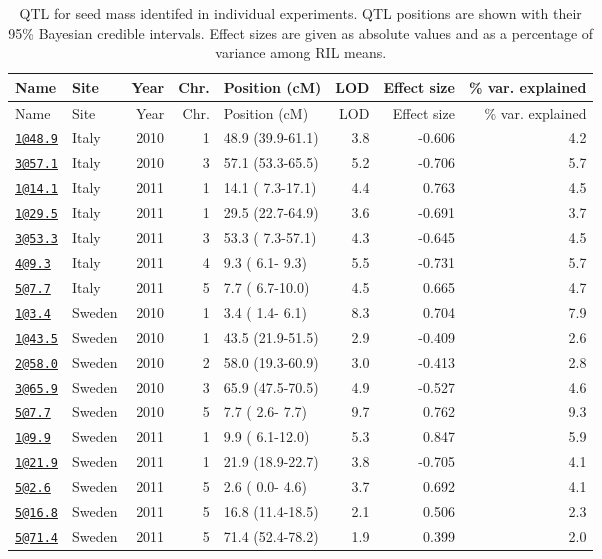 \documentclass[]{article}
\begin{document}
\begin{longtable}[]{@{}llrrlrrr@{}}
\caption{QTL for seed mass identifed in individual experiments. QTL
positions are shown with their 95\% Bayesian credible intervals. Effect
sizes are given as absolute values and as a percentage of variance among
RIL means.}\tabularnewline
\toprule
Name & Site & Year & Chr. & Position (cM) & LOD & Effect size & \% var.
explained\tabularnewline
\midrule
\endfirsthead
\toprule
Name & Site & Year & Chr. & Position (cM) & LOD & Effect size & \% var.
explained\tabularnewline
\midrule
\endhead
\href{mailto:1@48.9}{\nolinkurl{1@48.9}} & Italy & 2010 & 1 & 48.9
(39.9-61.1) & 3.8 & -0.606 & 4.2\tabularnewline
\href{mailto:3@57.1}{\nolinkurl{3@57.1}} & Italy & 2010 & 3 & 57.1
(53.3-65.5) & 5.2 & -0.706 & 5.7\tabularnewline
\href{mailto:1@14.1}{\nolinkurl{1@14.1}} & Italy & 2011 & 1 & 14.1 (
7.3-17.1) & 4.4 & 0.763 & 4.5\tabularnewline
\href{mailto:1@29.5}{\nolinkurl{1@29.5}} & Italy & 2011 & 1 & 29.5
(22.7-64.9) & 3.6 & -0.691 & 3.7\tabularnewline
\href{mailto:3@53.3}{\nolinkurl{3@53.3}} & Italy & 2011 & 3 & 53.3 (
7.3-57.1) & 4.3 & -0.645 & 4.5\tabularnewline
\href{mailto:4@9.3}{\nolinkurl{4@9.3}} & Italy & 2011 & 4 & 9.3 ( 6.1-
9.3) & 5.5 & -0.731 & 5.7\tabularnewline
\href{mailto:5@7.7}{\nolinkurl{5@7.7}} & Italy & 2011 & 5 & 7.7 (
6.7-10.0) & 4.5 & 0.665 & 4.7\tabularnewline
\href{mailto:1@3.4}{\nolinkurl{1@3.4}} & Sweden & 2010 & 1 & 3.4 ( 1.4-
6.1) & 8.3 & 0.704 & 7.9\tabularnewline
\href{mailto:1@43.5}{\nolinkurl{1@43.5}} & Sweden & 2010 & 1 & 43.5
(21.9-51.5) & 2.9 & -0.409 & 2.6\tabularnewline
\href{mailto:2@58.0}{\nolinkurl{2@58.0}} & Sweden & 2010 & 2 & 58.0
(19.3-60.9) & 3.0 & -0.413 & 2.8\tabularnewline
\href{mailto:3@65.9}{\nolinkurl{3@65.9}} & Sweden & 2010 & 3 & 65.9
(47.5-70.5) & 4.9 & -0.527 & 4.6\tabularnewline
\href{mailto:5@7.7}{\nolinkurl{5@7.7}} & Sweden & 2010 & 5 & 7.7 ( 2.6-
7.7) & 9.7 & 0.762 & 9.3\tabularnewline
\href{mailto:1@9.9}{\nolinkurl{1@9.9}} & Sweden & 2011 & 1 & 9.9 (
6.1-12.0) & 5.3 & 0.847 & 5.9\tabularnewline
\href{mailto:1@21.9}{\nolinkurl{1@21.9}} & Sweden & 2011 & 1 & 21.9
(18.9-22.7) & 3.8 & -0.705 & 4.1\tabularnewline
\href{mailto:5@2.6}{\nolinkurl{5@2.6}} & Sweden & 2011 & 5 & 2.6 ( 0.0-
4.6) & 3.7 & 0.692 & 4.1\tabularnewline
\href{mailto:5@16.8}{\nolinkurl{5@16.8}} & Sweden & 2011 & 5 & 16.8
(11.4-18.5) & 2.1 & 0.506 & 2.3\tabularnewline
\href{mailto:5@71.4}{\nolinkurl{5@71.4}} & Sweden & 2011 & 5 & 71.4
(52.4-78.2) & 1.9 & 0.399 & 2.0\tabularnewline
\bottomrule
\end{longtable}
\end{document}
